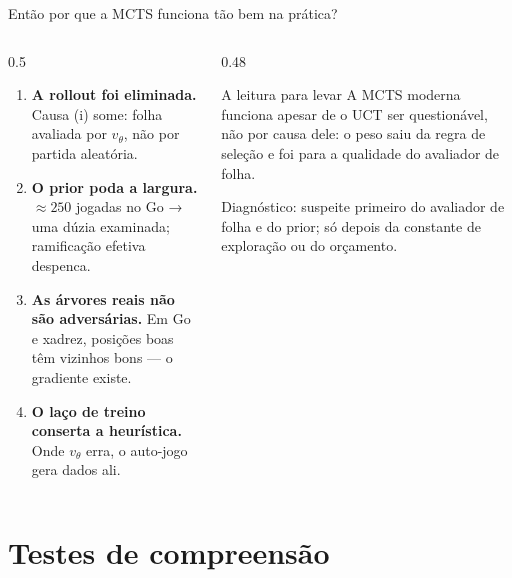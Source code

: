 \documentclass[aspectratio=169, 10pt]{beamer}
\newcommand{\redeval}{v_{\theta}}
\begin{document}
\begin{frame}{Então por que a MCTS funciona tão bem na prática?}
  \footnotesize
  \begin{columns}[T]
    \begin{column}{0.5\textwidth}
      \begin{enumerate}\setlength{\itemsep}{0.4em}
        \item \textbf{A rollout foi eliminada.} Causa (i) some: folha avaliada por $\redeval$, não por partida aleatória.
        \item \textbf{O prior poda a largura.} $\approx 250$ jogadas no Go → uma dúzia examinada; ramificação efetiva despenca.
        \item \textbf{As árvores reais não são adversárias.} Em Go e xadrez, posições boas têm vizinhos bons — o gradiente existe.
        \item \textbf{O laço de treino conserta a heurística.} Onde $\redeval$ erra, o auto-jogo gera dados ali.
      \end{enumerate}
    \end{column}
    \begin{column}{0.48\textwidth}
      \begin{teobox}{A leitura para levar}
        A MCTS moderna funciona apesar de o UCT ser questionável, não por causa
        dele: o peso saiu da regra de seleção e foi para a \alert{qualidade do
        avaliador de folha}.
      \end{teobox}
      \begin{alertabox}
        Diagnóstico: suspeite primeiro do avaliador de folha e do prior; só depois da constante de exploração ou do orçamento.
      \end{alertabox}
    \end{column}
  \end{columns}
\end{frame}

\section{Testes de compreensão}
\end{document}
